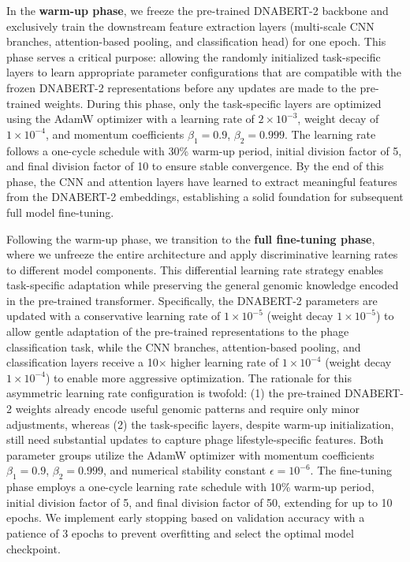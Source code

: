 \documentclass[runningheads]{llncs}
\begin{document}
In the \textbf{warm-up phase}, we freeze the pre-trained DNABERT-2 backbone and exclusively train the downstream feature extraction layers (multi-scale CNN branches, attention-based pooling, and classification head) for one epoch. This phase serves a critical purpose: allowing the randomly initialized task-specific layers to learn appropriate parameter configurations that are compatible with the frozen DNABERT-2 representations before any updates are made to the pre-trained weights. During this phase, only the task-specific layers are optimized using the AdamW optimizer \cite{loshchilov2017decoupled} with a learning rate of $2 \times 10^{-3}$, weight decay of $1 \times 10^{-4}$, and momentum coefficients $\beta_1 = 0.9$, $\beta_2 = 0.999$. The learning rate follows a one-cycle schedule \cite{smith2019super} with 30\% warm-up period, initial division factor of 5, and final division factor of 10 to ensure stable convergence. By the end of this phase, the CNN and attention layers have learned to extract meaningful features from the DNABERT-2 embeddings, establishing a solid foundation for subsequent full model fine-tuning.

Following the warm-up phase, we transition to the \textbf{full fine-tuning phase}, where we unfreeze the entire architecture and apply discriminative learning rates to different model components. This differential learning rate strategy enables task-specific adaptation while preserving the general genomic knowledge encoded in the pre-trained transformer. Specifically, the DNABERT-2 parameters are updated with a conservative learning rate of $1 \times 10^{-5}$ (weight decay $1 \times 10^{-5}$) to allow gentle adaptation of the pre-trained representations to the phage classification task, while the CNN branches, attention-based pooling, and classification layers receive a 10× higher learning rate of $1 \times 10^{-4}$ (weight decay $1 \times 10^{-4}$) to enable more aggressive optimization. The rationale for this asymmetric learning rate configuration is twofold: (1) the pre-trained DNABERT-2 weights already encode useful genomic patterns and require only minor adjustments, whereas (2) the task-specific layers, despite warm-up initialization, still need substantial updates to capture phage lifestyle-specific features. Both parameter groups utilize the AdamW optimizer with momentum coefficients $\beta_1 = 0.9$, $\beta_2 = 0.999$, and numerical stability constant $\epsilon = 10^{-6}$. The fine-tuning phase employs a one-cycle learning rate schedule with 10\% warm-up period, initial division factor of 5, and final division factor of 50, extending for up to 10 epochs. We implement early stopping based on validation accuracy with a patience of 3 epochs to prevent overfitting and select the optimal model checkpoint.
\end{document}
